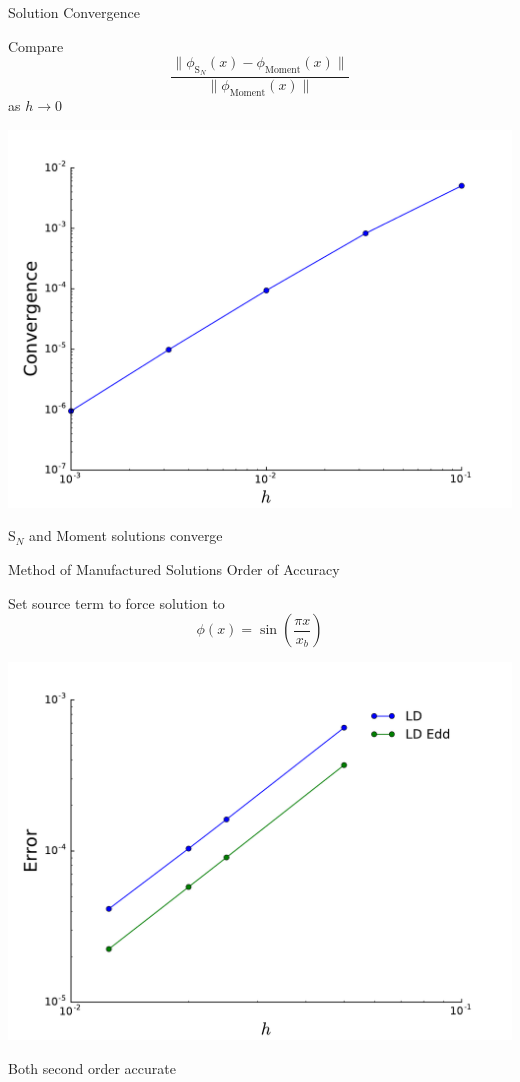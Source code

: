 \documentclass[10pt]{beamer}
\newcommand{\SN}{S$_N$\xspace}
\begin{document}
\begin{frame}{Solution Convergence}

	\onslide<+->
	Compare 
	\begin{equation*}
		\frac{\| \phi_{\text{S}_N}(x) - 
			\phi_\text{Moment}(x)\|}{\|\phi_\text{Moment}(x) \|}
	\end{equation*}
	as $h\rightarrow 0$ 

	\onslide<+->
	\centerline{\includegraphics[width=.5\paperwidth]{figs/hlim.pdf}}

	\onslide<+->
	\SN and Moment solutions converge 

\end{frame}

\begin{frame}{Method of Manufactured Solutions Order of Accuracy} 

	Set source term to force solution to 
	\begin{equation*}
		\phi(x) = \sin\left(\frac{\pi x}{x_b}\right)
	\end{equation*}

	\centerline{\includegraphics[width=.5\paperwidth]{figs/ooa.pdf}}

	Both second order accurate

\end{frame}
\end{document}
